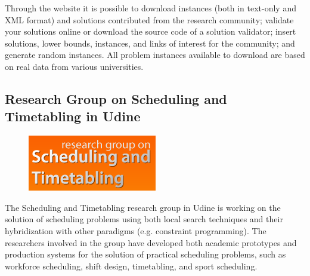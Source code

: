 Through the website it is possible to download instances (both in text-only and XML format) and solutions contributed from the research community; validate your solutions online or download the source code of a solution validator; insert solutions, lower bounds, instances, and links of interest for the community; and generate random instances. All problem instances available to download are based on real data from various universities.


\subsection{Research Group on Scheduling and Timetabling in Udine}
\label{satt}

\begin{figure}[h]
\hfill\includegraphics[scale=0.7]{figures/satt.png}
\end{figure}

The Scheduling and Timetabling research group in Udine is working on the solution of scheduling problems using both local search techniques and their hybridization with other paradigms (e.g. constraint programming). The researchers involved in the group have developed both academic prototypes and production systems for the solution of practical scheduling problems, such as workforce scheduling, shift design, timetabling, and sport scheduling.

